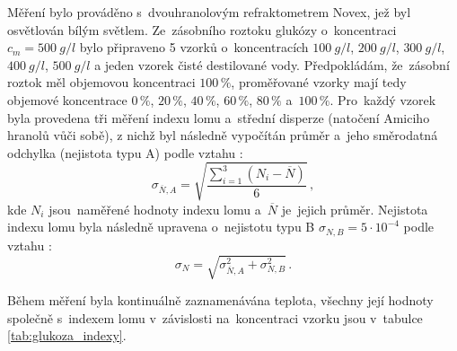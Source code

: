 \documentclass{../concepts/titul_protokol_p/prepareprotokol} %
\begin{document}
Měření bylo prováděno s~dvouhranolovým refraktometrem Novex, jež byl osvětlován bílým světlem.
Ze~zásobního roztoku glukózy o~koncentraci $c_m = \qty{500}{g \per l}$ bylo připraveno 5 vzorků
o~koncentracích $\qty{100}{g \per l}$, $\qty{200}{g \per l}$, $\qty{300}{g \per l}$, 
$\qty{400}{g \per l}$, $\qty{500}{g \per l}$ a jeden vzorek čisté destilované vody. Předpokládám, 
že~zásobní roztok měl objemovou koncentraci $100\,\%$, proměřované vzorky mají tedy objemové koncentrace
$0\,\%$, $20\,\%$, $40\,\%$, $60\,\%$, $80\,\%$ a~$100\,\%$. Pro~každý vzorek byla provedena tři měření
indexu lomu a~střední disperze (natočení Amiciho hranolů vůči sobě), z nichž byl následně vypočítán průměr
a~jeho směrodatná odchylka (nejistota typu A) podle vztahu \cite{englich}:
\begin{equation}
    \label{eq:glukoza_sigma_prumer_n}
    \sigma_{\overline{N},A} = \sqrt{\frac{\sum_{i=1}^{3} (N_i - \overline{N})}{6}} \,,
\end{equation}
kde $N_i$ jsou~naměřené hodnoty indexu lomu a~$\overline{N}$ je~jejich průměr. Nejistota indexu lomu byla
následně upravena o~nejistotu typu B $\sigma_{N,B} = 5\cdot10^{-4}$ podle vztahu \cite{englich}:
\begin{equation}
    \label{eq:glukoza_sigma_n}
    \sigma_{N} = \sqrt{\sigma_{\overline{N},A}^2 + \sigma_{N,B}^2} \,.
\end{equation}

Během měření byla kontinuálně
zaznamenávána teplota, všechny její hodnoty společně s~indexem lomu v~závislosti na~koncentraci vzorku
jsou v~tabulce \ref{tab:glukoza_indexy}.
\end{document}
